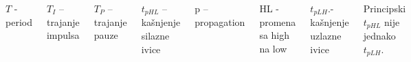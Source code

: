 \begin{frame}[label=08-s036]
\gusttekst\begin{columns}[c,onlytextwidth]\centering
{}
$T$ - period\par\medskip
$T_I$ – trajanje impulsa\par\medskip
$T_P$ – trajanje pauze\par\bigskip\bigskip
$t_{pHL}$ – kašnjenje silazne ivice\par
p – propagation\par
HL - promena sa high na low\par\bigskip
$t_{pLH}$.- kašnjenje uzlazne ivice\par\bigskip
Principski $t_{pHL}$ nije jednako $t_{pLH}$.
\end{columns}
\end{frame}
